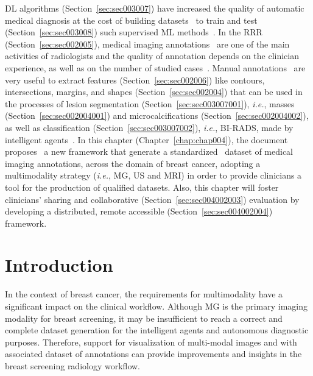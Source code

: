 \clearpage
\label{chap:chap004}

\ac{DL} algorithms (Section~\ref{sec:sec003007}) have increased the quality of automatic medical diagnosis at the cost of building datasets~\cite{10.1145/3313831.3376219} to train and test (Section~\ref{sec:sec003008}) such supervised \ac{ML} methods~\cite{10.1145/3206505.3206555}.
In the \ac{RRR} (Section~\ref{sec:sec002005}), medical imaging annotations~\cite{10.1145/3132272.3134111, calisto2019itmedex} are one of the main activities of radiologists and the quality of annotation depends on the clinician experience, as well as on the number of studied cases~\cite{doi:10.1148/radiol.2016150409}.
Manual annotations~\cite{10.1145/3399715.3399744} are very useful to extract features (Section~\ref{sec:sec002006}) like contours, intersections, margins, and shapes (Section~\ref{sec:sec002004}) that can be used in the processes of lesion segmentation (Section~\ref{sec:sec003007001}), {\it i.e.}, masses (Section~\ref{sec:sec002004001}) and microcalcifications (Section~\ref{sec:sec002004002}), as well as classification (Section~\ref{sec:sec003007002}), {\it i.e.}, \ac{BI-RADS}, made by intelligent agents~\cite{10.1145/3290605.3300468}.
In this chapter (Chapter~\ref{chap:chap004}), the document proposes~\cite{10.1145/3399715.3399744, https://doi.org/10.13140/rg.2.2.14792.55049, https://doi.org/10.13140/rg.2.2.16086.88649} a new framework that generate a standardized~\cite{lencastre2020mvf, calisto2015aqmgasa} dataset of medical imaging annotations, across the domain of breast cancer, adopting a multimodality strategy ({\it i.e.}, \ac{MG}, \ac{US} and \ac{MRI}) in order to provide clinicians a tool for the production of qualified datasets.
Also, this chapter will foster clinicians' sharing and collaborative (Section~\ref{sec:sec004002003}) evaluation by developing a distributed, remote accessible (Section~\ref{sec:sec004002004}) framework.

\section{Introduction}
\label{sec:sec004001}

In the context of breast cancer, the requirements for multimodality have a significant impact on the clinical workflow.
Although \ac{MG} is the primary imaging modality for breast screening, it may be insufficient to reach a correct and complete dataset generation for the intelligent agents and autonomous diagnostic purposes.
Therefore, support for visualization of multi-modal images and with associated dataset of annotations can provide improvements and insights in the breast screening radiology workflow.

